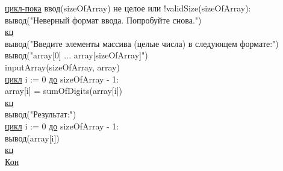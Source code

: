 \noindent
\null\qquad \underline{цикл-пока} ввод(sizeOfArray) не целое или !validSize(sizeOfArray):\\
\null\qquad \qquad вывод("Неверный формат ввода. Попробуйте снова.")\\
\null\qquad \underline{кц}\\

\noindent
\null\qquad вывод("Введите элементы массива (целые числа) в следующем формате:")\\
\null\qquad вывод("array[0] ... array[sizeOfArray]")\\
\null\qquad inputArray(sizeOfArray, array)\\

\noindent
\null\qquad \underline{цикл} i := 0 \underline{до} sizeOfArray - 1:\\
\null\qquad \qquad array[i] = sumOfDigits(array[i])\\
\null\qquad \underline{кц}\\

\noindent
\null\qquad вывод("Результат:")\\
\null\qquad \underline{цикл} i := 0 \underline{до} sizeOfArray - 1:\\
\null\qquad \qquad вывод(array[i])\\
\null\qquad \underline{кц}\\

\noindent
\underline{Кон}\\
